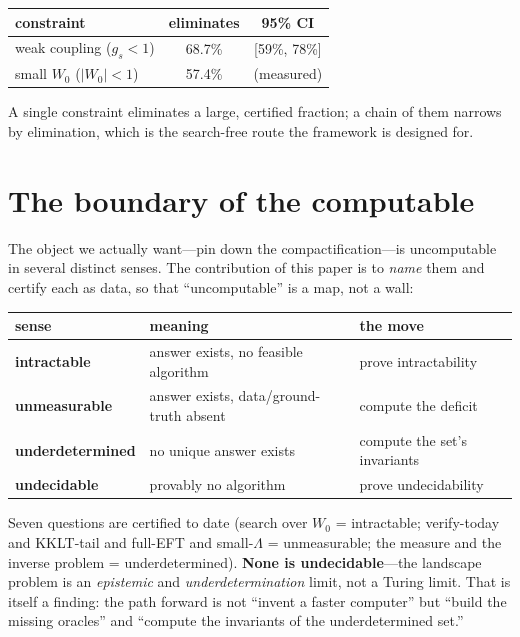 \documentclass[11pt]{article}
\begin{document}
\begin{center}
\begin{tabular}{lcc}
\toprule
constraint & eliminates & 95\% CI \\
\midrule
weak coupling ($g_s < 1$) & 68.7\% & [59\%, 78\%] \\
small $W_0$ ($|W_0| < 1$) & 57.4\% & (measured) \\
\bottomrule
\end{tabular}
\end{center}

A single constraint eliminates a large, certified fraction; a chain of them narrows by
elimination, which is the search-free route the framework is designed for.

\section{The boundary of the computable}
\label{sec:boundary}

The object we actually want---pin down the compactification---is uncomputable in several
distinct senses. The contribution of this paper is to \emph{name} them and certify each
as data, so that ``uncomputable'' is a map, not a wall:

\begin{center}
\begin{tabular}{lll}
\toprule
sense & meaning & the move \\
\midrule
\textbf{intractable} & answer exists, no feasible algorithm & prove intractability \\
\textbf{unmeasurable} & answer exists, data/ground-truth absent & compute the deficit \\
\textbf{underdetermined} & no unique answer exists & compute the set's invariants \\
\textbf{undecidable} & provably no algorithm & prove undecidability \\
\bottomrule
\end{tabular}
\end{center}

Seven questions are certified to date (search over $W_0$ = intractable; verify-today and
KKLT-tail and full-EFT and small-$\Lambda$ = unmeasurable; the measure and the inverse
problem = underdetermined). \textbf{None is undecidable}---the landscape problem is an
\emph{epistemic} and \emph{underdetermination} limit, not a Turing limit. That is itself
a finding: the path forward is not ``invent a faster computer'' but ``build the missing
oracles'' and ``compute the invariants of the underdetermined set.''
\end{document}
